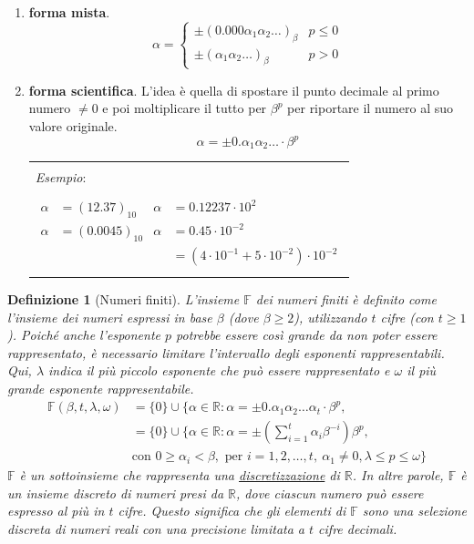 \documentclass{article}
\newtheorem*{definition}{\color{red}\textbf{Definizione}}
\newenvironment{example}
{\begin{center}
        \begin{tabular}{|p{0.9\textwidth}|}
            \hline \\ 
            \textit{Esempio}: \\\\ 
        }
        {
            \\\\ \hline
        \end{tabular}
    \end{center}
}
\begin{document}
\begin{enumerate}
    \item \textbf{forma mista}.
        $$\alpha=\begin{cases}
            \pm(0.000\alpha_1\alpha_2\ldots)_\beta & p\leq 0\\
            \pm(\alpha_1\alpha_2\ldots)_\beta & p>0
        \end{cases}$$
    \item \textbf{forma scientifica}. L'idea è quella di spostare il punto decimale al primo numero $\neq 0$ e
        poi moltiplicare il tutto per $\beta^p$ per riportare il numero al suo valore originale.
        $$\alpha=\pm0.\alpha_1\alpha_2\ldots\cdot\beta^p$$
        \begin{example}
            \begin{equation*}
               \begin{aligned}
                   \alpha&=(12.37)_{10} & \alpha&=0.12237\cdot 10^2 \\
                   \alpha&=(0.0045)_{10} & \alpha&=0.45\cdot 10^{-2} \\ 
                         & & &=(4\cdot 10^{-1}+5\cdot 10^{-2})\cdot 10^{-2}
               \end{aligned} 
            \end{equation*}
        \end{example}
\end{enumerate}
\begin{definition}[Numeri finiti]
    L'insieme $\mathbb{F}$ dei numeri finiti è definito come l'insieme dei numeri espressi in base $\beta$
    (dove $\beta\geq 2$), utilizzando $t$ cifre (con $t\geq 1$). Poiché anche l'esponente $p$
    potrebbe essere così grande da non poter essere rappresentato, è necessario limitare
    l'intervallo degli esponenti rappresentabili. Qui, $\lambda$ indica il più piccolo esponente che
    può essere rappresentato e $\omega$ il più grande esponente rappresentabile.
    \begin{equation*}
        \begin{aligned}
            \mathbb{F}(\beta,t,\lambda,\omega)&=\{0\}\cup\{\alpha\in\mathbb{R}:\alpha=\pm0.\alpha_1\alpha_2\ldots\alpha_t\cdot\beta^p, \\
                              &=\{0\}\cup\{\alpha\in\mathbb{R}:\alpha=\pm(\sum_{i=1}^{t}\alpha_i\beta^{-i})\beta^p, \\ 
                              &\text{con } 0\geq\alpha_i<\beta, \text{ per }i=1,2,\ldots,t,\ \alpha_1\neq 0, \lambda\leq p\leq \omega\}
        \end{aligned}
    \end{equation*}
    $\mathbb{F}$ è un sottoinsieme che rappresenta una \underline{discretizzazione} di $\mathbb{R}$. In altre parole,
    $\mathbb{F}$ è un insieme discreto di numeri presi da $\mathbb{R}$, dove ciascun numero può essere espresso al più in $t$
    cifre. Questo significa che gli elementi di $\mathbb{F}$ sono una selezione discreta di numeri reali con una
    precisione limitata a $t$ cifre decimali.
\end{definition}
\end{document}
